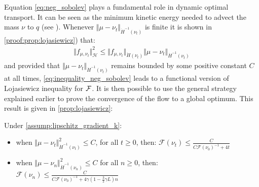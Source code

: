 Equation \cref{eq:neg_sobolev} plays a fundamental role in dynamic optimal transport. %
It can be seen as the minimum kinetic energy needed to advect the mass $\nu$ to $q$ (see \cite{mroueh2018regularized}). Whenever $\Vert \mu - \nu_t \Vert_{\dot{H}^{-1}(\nu_t)} $ is finite it is shown in \cref{proof:prop:lojasiewicz}) that:
\begin{align}\label{eq:inequality_neg_sobolev}
	\Vert f_{\mu,\nu_t} \Vert^2_{\mathcal{H}} \leq \Vert f_{\mu,\nu_t} \Vert_{\dot{H}(\nu_t)} \Vert  \mu -\nu_t\Vert_{\dot{H}^{-1}(\nu_t)}  
\end{align}
and provided that $\Vert \mu - \nu_t \Vert_{\dot{H}^{-1}(\nu_t)} $ remains bounded by some positive constant $C$ at all times, \cref{eq:inequality_neg_sobolev} leads to  a functional version of Lojasiewicz inequality for ${{\mathcal F}}$. 
It is then possible to use the general strategy explained earlier to prove the convergence of the flow to a global optimum. This result is given in \cref{prop:lojasiewicz}:
\begin{proposition}\label{prop:lojasiewicz}
		Under \cref{assump:lipschitz_gradient_k}:
		\begin{itemize}
			\item when $\Vert \mu - \nu_t \Vert^2_{\dot{H}^{-1}(\nu_t)} \leq C$, for all $t\geq 0$, then: $\mathcal{F}(\nu_t)\leq \frac{C}{C\mathcal{F}(\nu_0)^{-1} + 4t}$
			\item when $\Vert \mu - \nu_n \Vert^2_{\dot{H}^{-1}(\nu_n)} \leq C$ for all $n\geq 0$, then: $\mathcal{F}(\nu_n)\leq \frac{C}{C\mathcal{F}(\nu_0)^{-1} + 4\gamma(1-\frac{3}{2}\gamma L) n}$
		\end{itemize}
\end{proposition}
